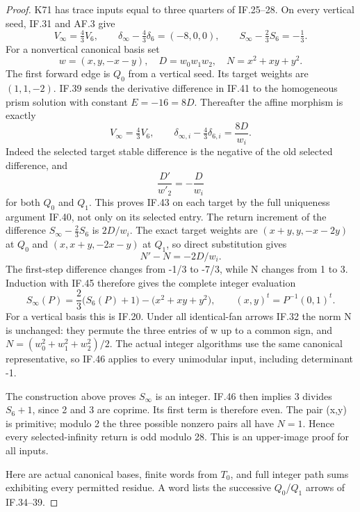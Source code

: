\begin{proof}
K71 has trace inputs equal to three quarters of IF.25--28.  On every
vertical seed, IF.31 and AF.3 give
\[
 V_\infty=\tfrac43V_6,\qquad
 \delta_\infty-\tfrac43\delta_6=(-8,0,0),\qquad
 S_\infty-\tfrac23S_6=-\tfrac13.
 \tag{IF.41}
\]
For a nonvertical canonical basis set
\[
 w=(x,y,-x-y),\quad D=w_0w_1w_2,\quad
                    N=x^2+xy+y^2.
 \tag{IF.42}
\]
The first forward edge is \(Q_0\) from a vertical seed.  Its target
weights are \((1,1,-2)\).  IF.39 sends the derivative difference in
IF.41 to the homogeneous prism solution with constant \(E=-16=8D\).
Thereafter the affine morphism is exactly
\[
 V_\infty=\tfrac43V_6,\qquad
 \delta_{\infty,i}-\tfrac43\delta_{6,i}=\frac{8D}{w_i}.
 \tag{IF.43}
\]
Indeed the selected target stable difference is the negative of
the old selected difference, and
\[
                   \frac{D'}{w'_2}=-\frac{D}{w_i}
 \tag{IF.44}
\]
for both \(Q_0\) and \(Q_1\).  This proves IF.43 on each target by the full
uniqueness argument IF.40, not only on its selected entry.  The
return increment of the difference
\(S_\infty-\tfrac23S_6\) is \(2D/w_i\).  The exact target
weights are \((x+y,y,-x-2y)\) at \(Q_0\) and \((x,x+y,-2x-y)\) at \(Q_1\), so direct
substitution gives
\[
                         N'-N=-2D/w_i.
 \tag{IF.45}
\]
The first-step difference changes from -1/3 to -7/3, while N changes
from 1 to 3.  Induction with IF.45 therefore gives the complete integer
evaluation
\[
 \boxed{\displaystyle
 S_\infty(P)=\frac23\bigl(S_6(P)+1\bigr)
                   -\bigl(x^2+xy+y^2\bigr),\qquad
 (x,y)^t=P^{-1}(0,1)^t.}
 \tag{IF.46}
\]
For a vertical basis this is IF.20.  Under all identical-fan arrows
IF.32 the norm N is unchanged: they permute the three entries of w
up to a common sign, and \(N=(w_0^2+w_1^2+w_2^2)/2\).
The actual integer algorithms use the same canonical representative,
so IF.46 applies to every unimodular input, including determinant -1.

The construction above proves \(S_\infty\) is an integer.  IF.46 then
implies 3 divides \(S_6+1\), since 2 and 3 are coprime.  Its first term is
therefore even.  The pair (x,y) is primitive; modulo 2 the three
possible nonzero pairs all have \(N=1\).  Hence every selected-infinity
return is odd modulo 28.  This is an upper-image proof for all inputs.

Here are actual canonical bases, finite words from \(T_0\), and full
integer path sums exhibiting every permitted residue.  A word lists
the successive \(Q_0\)/\(Q_1\) arrows of IF.34--39.


\end{proof}
